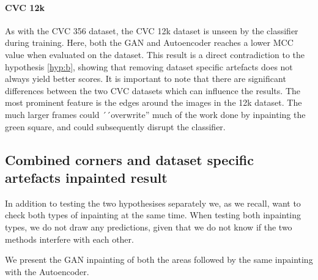 \paragraph{CVC 12k}
As with the CVC 356 dataset, the CVC 12k dataset is unseen by the classifier during training. 
Here, both the GAN and Autoencoder reaches a lower MCC value when evaluated on the dataset. 
This result is a direct contradiction to the hypothesis \ref{hyp:b}, showing that removing dataset specific artefacts does not always yield better scores. 
It is important to note that there are significant differences between the two CVC datasets which can influence the results. The most prominent feature is the edges around the images in the 12k dataset. The much larger frames could  ´´overwrite'' much of the work done by inpainting the green square, and could subsequently disrupt the classifier.














































\FloatBarrier
\subsection{Combined corners and dataset specific artefacts inpainted result}

In addition to testing the two hypothesises separately we, as we recall, want to check both types of inpainting at the same time.
When testing both inpainting types, we do not draw any predictions, given that we do not know if the two methods interfere with each other. 

We present the GAN inpainting of both the areas followed by the same inpainting with the Autoencoder.


